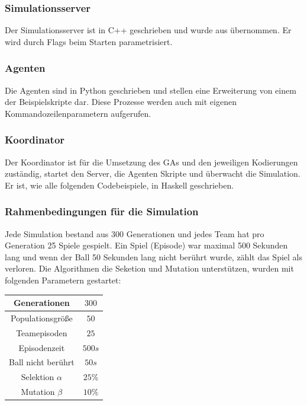         \subsubsection*{Simulationsserver}
        Der Simulationsserver ist in C++ geschrieben und wurde aus \cite{hfo} übernommen. Er wird durch Flags beim Starten parametrisiert.

        \subsubsection*{Agenten}
        Die Agenten sind in Python geschrieben und stellen eine Erweiterung von einem der Beispielskripte dar\cite{hfo}. Diese Prozesse werden auch mit eigenen Kommandozeilenparametern aufgerufen.

        \subsubsection*{Koordinator}
        Der Koordinator ist für die Umsetzung des GAs und den jeweiligen Kodierungen zuständig, startet den Server, die Agenten Skripte und überwacht die Simulation. Er ist, wie alle folgenden Codebeispiele, in Haskell geschrieben.


        \subsubsection*{Rahmenbedingungen für die Simulation}
        Jede Simulation bestand aus 300 Generationen und jedes Team hat pro Generation 25 Spiele gespielt. Ein Spiel (Episode) war maximal 500 Sekunden lang und wenn der Ball 50 Sekunden lang nicht berührt wurde, zählt das Spiel als verloren. Die Algorithmen die Seketion und Mutation unterstützen, wurden mit folgenden Parametern gestartet:

        \begin{center}
            \begin{tabular}{ |c|c| } 
                \hline
                Generationen       & $300$  \\ \hline
                Populationsgröße   & $50$   \\ \hline
                Teamepisoden       & $25$   \\ \hline
                Episodenzeit       & $500s$ \\ \hline
                Ball nicht berührt & $50s$  \\ \hline
                Selektion $\alpha$ & $25\%$ \\ \hline
                Mutation $\beta$   & $10\%$ \\ \hline
            \end{tabular}
        \end{center}

